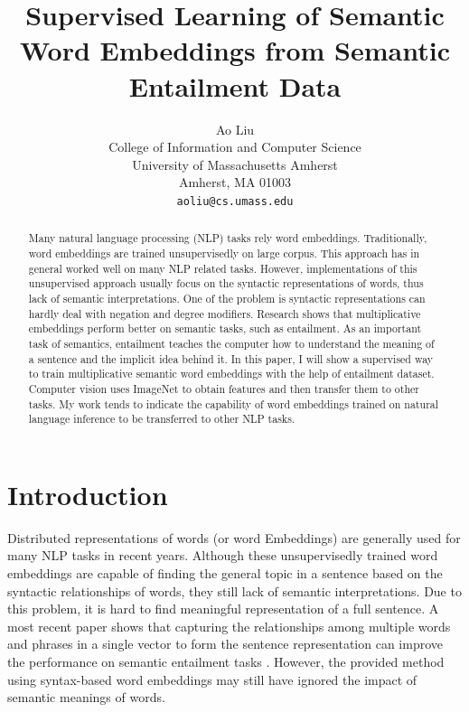 \documentclass{article}
\title{Supervised Learning of Semantic Word Embeddings from Semantic Entailment Data}
\author{
  Ao Liu\\
  College of Information and Computer Science\\
  University of Massachusetts Amherst\\
  Amherst, MA 01003\\
  \texttt{aoliu@cs.umass.edu} \\
}
\begin{document}

\maketitle

\begin{abstract}
Many natural language processing (NLP) tasks rely word embeddings. Traditionally, word embeddings are trained unsupervisedly on large corpus. This approach has in general worked well on many NLP related tasks. However, implementations of this unsupervised approach usually focus on the syntactic representations of words, thus lack of semantic interpretations. One of the problem is syntactic representations can hardly deal with negation and degree modifiers. Research shows that multiplicative embeddings perform better on semantic tasks, such as entailment. As an important task of semantics, entailment teaches the computer how to understand the meaning of a sentence and the implicit idea behind it. In this paper, I will show a supervised way to train multiplicative semantic word embeddings with the help of entailment dataset. Computer vision uses ImageNet to obtain features and then transfer them to other tasks. My work tends to indicate the capability of word embeddings trained on natural language inference to be transferred to other NLP tasks.
\end{abstract}

\section{Introduction}
Distributed representations of words (or word Embeddings)\cite{bengio2003neural, collobert2011natural, mikolov2013distributed, pennington2014glove} are generally used for many NLP tasks in recent years. Although these unsupervisedly trained word embeddings are capable of finding the general topic in a sentence based on the syntactic relationships of words, they still lack of semantic interpretations. Due to this problem, it is hard to find meaningful representation of a full sentence. A most recent paper shows that capturing the relationships among multiple words and phrases in a single vector to form the sentence representation can improve the performance on semantic entailment tasks \cite{conneau2017supervised}. However, the provided method using syntax-based word embeddings may still have ignored the impact of semantic meanings of words.
\end{document}
